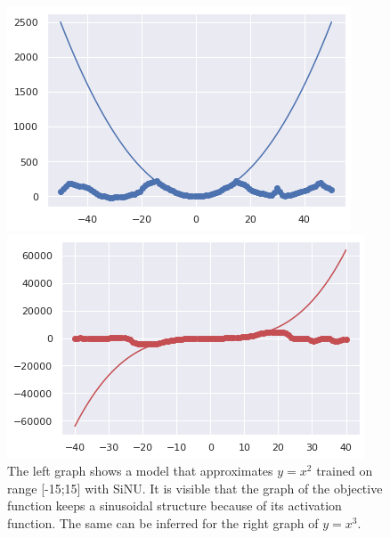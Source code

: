 \documentclass{article}
\begin{document}
\begin{figure}[H]
\begin{multicols}{2}
    \includegraphics[width=\linewidth]{x2_SiNU.png}\par
    \includegraphics[width=\linewidth]{x3_SiNU.png}\par
\end{multicols}
\caption{The left graph shows a model that approximates $y = x^2$ trained on range [-15;15] with SiNU. It is visible that the graph of the objective function keeps a sinusoidal structure because of its activation function. The same can be inferred for the right graph of $y=x^3$.}
\end{figure}
\end{document}
